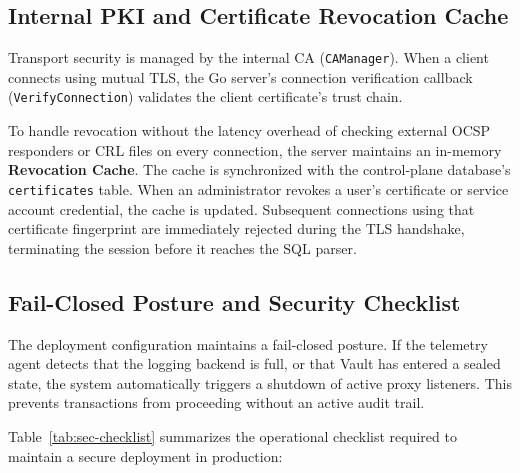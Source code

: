 \subsection{Internal PKI and Certificate Revocation Cache}
Transport security is managed by the internal CA (\texttt{CAManager}). When a client connects using mutual TLS, the Go server's connection verification callback (\texttt{VerifyConnection}) validates the client certificate's trust chain.

To handle revocation without the latency overhead of checking external OCSP responders or CRL files on every connection, the server maintains an in-memory \textbf{Revocation Cache}. The cache is synchronized with the control-plane database's \texttt{certificates} table. When an administrator revokes a user's certificate or service account credential, the cache is updated. Subsequent connections using that certificate fingerprint are immediately rejected during the TLS handshake, terminating the session before it reaches the SQL parser.

\subsection{Fail-Closed Posture and Security Checklist}
The deployment configuration maintains a fail-closed posture. If the telemetry agent detects that the logging backend is full, or that Vault has entered a sealed state, the system automatically triggers a shutdown of active proxy listeners. This prevents transactions from proceeding without an active audit trail.

Table~\ref{tab:sec-checklist} summarizes the operational checklist required to maintain a secure deployment in production:

\begin{table}[H]
\centering
\caption{Production Security Settings Checklist}
\label{tab:sec-checklist}
\end{table}
